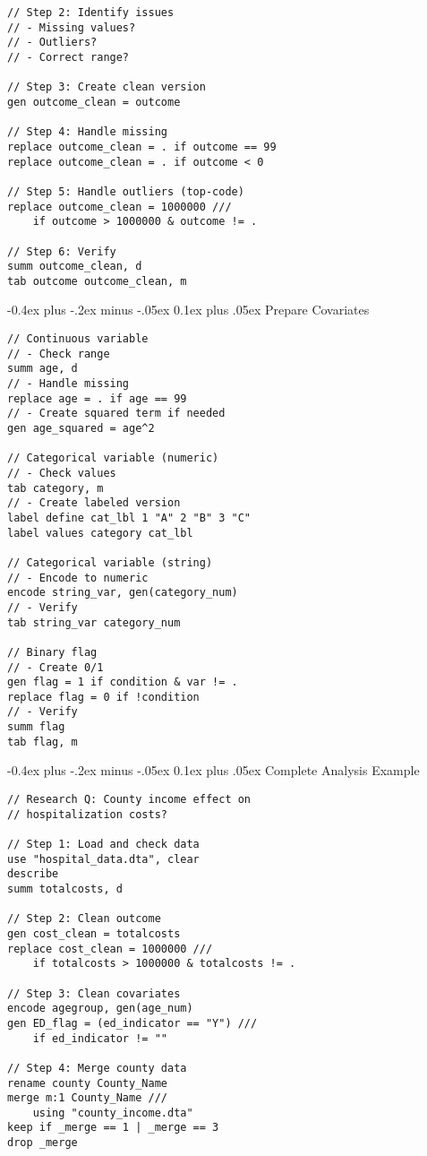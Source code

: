\documentclass[8pt,landscape,a4paper]{article}
\makeatletter
\renewcommand{\subsection}{\@startsection{subsection}{2}{0mm}%
                                {-0.4ex plus -.2ex minus -.05ex}%
                                {0.1ex plus .05ex}%
                                {\normalfont\fontsize{7.5pt}{7.5pt}\selectfont\bfseries\color{myblue}}}
\makeatother
\begin{document}
\begin{multicols}{3}
\begin{lstlisting}
// Step 2: Identify issues
// - Missing values?
// - Outliers?
// - Correct range?

// Step 3: Create clean version
gen outcome_clean = outcome

// Step 4: Handle missing
replace outcome_clean = . if outcome == 99
replace outcome_clean = . if outcome < 0

// Step 5: Handle outliers (top-code)
replace outcome_clean = 1000000 ///
    if outcome > 1000000 & outcome != .

// Step 6: Verify
summ outcome_clean, d
tab outcome outcome_clean, m
\end{lstlisting}

\subsection{Prepare Covariates}
\begin{lstlisting}
// Continuous variable
// - Check range
summ age, d
// - Handle missing
replace age = . if age == 99
// - Create squared term if needed
gen age_squared = age^2

// Categorical variable (numeric)
// - Check values
tab category, m
// - Create labeled version
label define cat_lbl 1 "A" 2 "B" 3 "C"
label values category cat_lbl

// Categorical variable (string)
// - Encode to numeric
encode string_var, gen(category_num)
// - Verify
tab string_var category_num

// Binary flag
// - Create 0/1
gen flag = 1 if condition & var != .
replace flag = 0 if !condition
// - Verify
summ flag
tab flag, m
\end{lstlisting}

\subsection{Complete Analysis Example}
\begin{lstlisting}
// Research Q: County income effect on
// hospitalization costs?

// Step 1: Load and check data
use "hospital_data.dta", clear
describe
summ totalcosts, d

// Step 2: Clean outcome
gen cost_clean = totalcosts
replace cost_clean = 1000000 ///
    if totalcosts > 1000000 & totalcosts != .

// Step 3: Clean covariates
encode agegroup, gen(age_num)
gen ED_flag = (ed_indicator == "Y") ///
    if ed_indicator != ""

// Step 4: Merge county data
rename county County_Name
merge m:1 County_Name ///
    using "county_income.dta"
keep if _merge == 1 | _merge == 3
drop _merge


\end{lstlisting}
\end{multicols}
\end{document}
